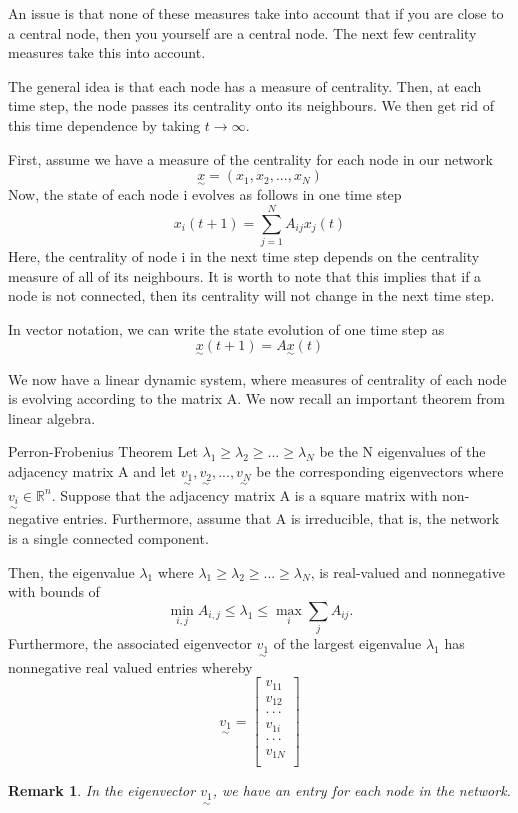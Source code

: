 \documentclass[twoside]{article}
\newcommand{\utilde}{\underset{\sim}}
\newtheorem{remark}[theorem]{Remark}
\begin{document}
An issue is that none of these measures take into account that if you are close to a central node, then you yourself are a central node. The next few centrality measures take this into account.


The general idea is that each node has a measure of centrality. Then, at each time step, the node passes its centrality onto its neighbours. We then get rid of this time dependence by taking $t \rightarrow \infty.$

First, assume we have a measure of the centrality for each node in our network 
$$
\utilde{x} = (x_1, x_2, ..., x_N)
$$
Now, the state of each node i evolves as follows in one time step
$$
x_i(t + 1) = \sum_{j=1}^{N}A_{ij}x_j(t)
$$
Here, the centrality of node i in the next time step depends on the centrality measure of all of its neighbours. It is worth to note that this implies that if a node is not connected, then its centrality will not change in the next time step.

In vector notation, we can write the state evolution of one time step as
\begin{equation}
\utilde{x}(t + 1) = A\utilde{x}(t)
\tag{*}
\end{equation}

We now have a linear dynamic system, where measures of centrality of each node is evolving according to the matrix A. We now recall an important theorem from linear algebra.
\begin{theorem_exam}{Perron-Frobenius Theorem}{} Let $\lambda_1 \geq \lambda_2 \geq ... \geq \lambda_N$ be the N eigenvalues of the adjacency matrix A and let $\utilde{v_1}, \utilde{v_2}, ..., \utilde{v_N}$ be the corresponding eigenvectors where $\utilde{v_i} \in \mathbb{R}^n$. Suppose that the adjacency matrix A is a square matrix with non-negative entries. Furthermore, assume that A is irreducible, that is, the network is a single connected component.

Then, the eigenvalue $\lambda_1$ where $\lambda_1 \geq \lambda_2 \geq ... \geq \lambda_N$, is real-valued and nonnegative with bounds of 
$$
\min_{i,j}A_{i,j} \leq \lambda_1 \leq \max_i\sum_{j}A_{ij}.
$$
Furthermore, the associated eigenvector $\utilde{v_1}$ of the largest eigenvalue $\lambda_1$ has nonnegative real valued entries whereby 
$$
\utilde{v_1} = 
\begin{bmatrix}
v_{11}\\
v_{12}\\
\cdot \cdot \cdot \\
v_{1i}\\
\cdot \cdot \cdot \\
v_{1N}\\
\end{bmatrix}
$$
\end{theorem_exam}
\begin{remark}In the eigenvector $\utilde{v_1}$, we have an entry for each node in the network.
\end{remark}
\end{document}
